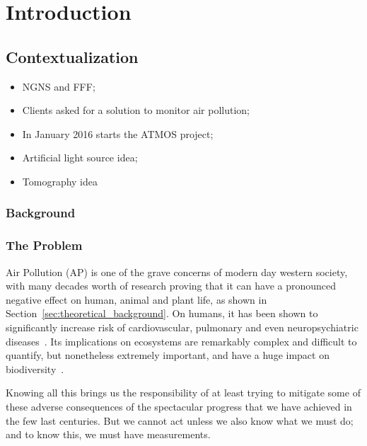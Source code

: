 \newcommand{\novathesis}{\emph{novathesis}}
\newcommand{\novathesisclass}{\texttt{novathesis.cls}}


\chapter{Introduction}
\label{cha:introduction}

\section{Contextualization}%
\label{sec:contextualisation}
\begin{itemize}
    \item NGNS and FFF;
    \item Clients asked for a solution to monitor air pollution;
    \item In January 2016 starts the ATMOS project;
    \item Artificial light source idea;
    \item Tomography idea
\end{itemize}

\subsection{Background}%
\label{sub:background}

\subsection{The Problem}%
\label{sub:the_problem}

Air Pollution (\gls{AP}) is one of the grave concerns of modern day
western society, with many decades worth of research proving that it can
have a pronounced negative effect on human, animal and plant life, as
shown in Section~\ref{sec:theoretical_background}. On humans, it has
been shown to significantly increase risk of cardiovascular, pulmonary
and even neuropsychiatric diseases~\cite{Carugno2016, Ghorani-Azam2016,
Kampa2008}. Its implications on ecosystems are remarkably complex and
difficult to quantify, but nonetheless extremely important, and have a
huge impact on biodiversity~\cite{Lovett2009}.

Knowing all this brings us the responsibility of at least trying to
mitigate some of these adverse consequences of the spectacular progress
that we have achieved in the few last centuries. But we cannot act
unless we also know what we must do; and to know this, we must have
measurements.

